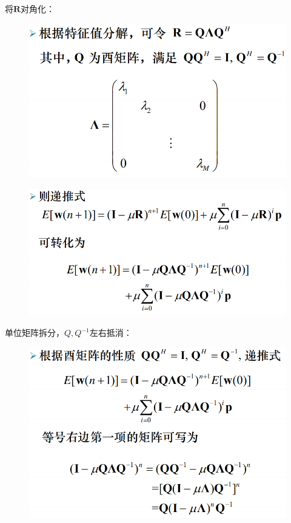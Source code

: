 \documentclass[UTF8]{ctexart} %
\begin{document}
			将$\textbf{R}$对角化：
			\begin{figure}[H]
				\centering\includegraphics[scale=0.4]{27.png}
			\end{figure}	
			\begin{figure}[H]
				\centering\includegraphics[scale=0.4]{28.png}
			\end{figure}
			单位矩阵拆分，$Q,Q^{-1}$左右抵消：	
			\begin{figure}[H]
				\centering\includegraphics[scale=0.4]{29.png}
			\end{figure}
\end{document}
